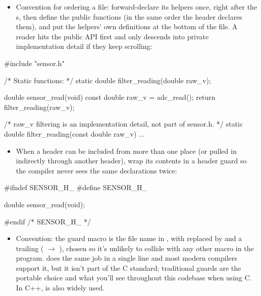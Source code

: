 \begin{itemize}
  \item Convention for ordering a  file: forward-declare its  helpers once,
    right after the s, then define the public functions (in the same order the
    header declares them), and put the  helpers' own definitions at the bottom of the
    file. A reader hits the public API first and only descends into private implementation detail
    if they keep scrolling:
\end{itemize}

\begin{ccode}
#include "sensor.h"

/* Static functions: */
static double filter_reading(double raw_v);

double sensor_read(void)
{
    const double raw_v = adc_read();
    return filter_reading(raw_v);
}

/* raw_v filtering is an implementation detail, not part of sensor.h. */
static double filter_reading(const double raw_v)
{
    ...
}
\end{ccode}

\begin{itemize}
  \item When a header can be included from more than one place (or pulled in indirectly through
    another header), wrap its contents in a header guard so the compiler never sees the same
    declarations twice:
\end{itemize}

\begin{ccode}
#ifndef SENSOR_H_
#define SENSOR_H_

double sensor_read(void);

#endif /* SENSOR_H_ */
\end{ccode}

\begin{itemize}
  \item Convention: the guard macro is the file name in , with  replaced
    by \code{_} and a trailing \code{_} ( $\rightarrow$ ), chosen so
    it's unlikely to collide with any other macro in the program.  does the same
    job in a single line and most modern compilers support it, but it isn't part of the C standard;
    traditional guards are the portable choice and what you'll see throughout this codebase when
    using C. In C++,  is also widely used.
\end{itemize}

